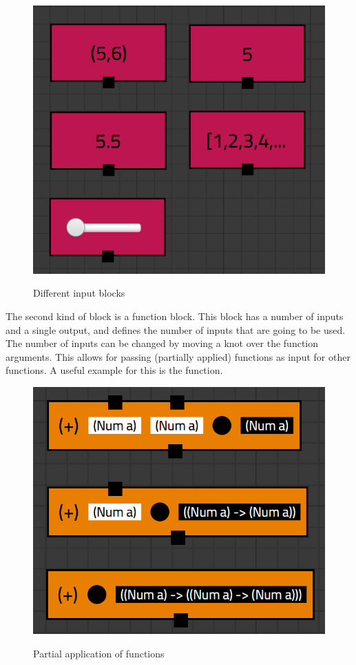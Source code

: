 \begin{figure}[p]
	\centering
	\includegraphics[scale=0.5]{Images/blocks-inputs}
	\label{fig:blocks-inputs}
	\caption{Different input blocks}
\end{figure}

The second kind of block is a function block. This block has a number of inputs and a single output, and defines the number of inputs that are going to be used.
The number of inputs can be changed by moving a knot over the function arguments.
This allows for passing (partially applied) functions as input for other functions.
A useful example for this is the  function.

\begin{figure}[p]
	\centering
	\includegraphics[scale=0.5]{Images/blocks-bowties}
	\label{fig:blocks-bowties}
	\caption{Partial application of functions}
\end{figure}

